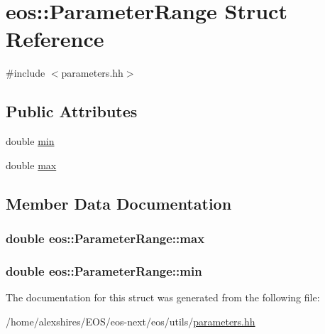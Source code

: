 \hypertarget{structeos_1_1ParameterRange}{
\section{eos::ParameterRange Struct Reference}
\label{structeos_1_1ParameterRange}
}


{\ttfamily \#include $<$parameters.hh$>$}\subsection*{Public Attributes}
\begin{DoxyCompactItemize}
\item 
double \hyperlink{structeos_1_1ParameterRange_ab155cf01cbc6b1ea802a007fe5bcc6c6}{min}
\item 
double \hyperlink{structeos_1_1ParameterRange_a8ce3020d0f5ca651abed940889bb434b}{max}
\end{DoxyCompactItemize}


\subsection{Member Data Documentation}
\hypertarget{structeos_1_1ParameterRange_a8ce3020d0f5ca651abed940889bb434b}{
\subsubsection[{max}]{\setlength{\rightskip}{0pt plus 5cm}double {\bf eos::ParameterRange::max}}}
\label{structeos_1_1ParameterRange_a8ce3020d0f5ca651abed940889bb434b}
\hypertarget{structeos_1_1ParameterRange_ab155cf01cbc6b1ea802a007fe5bcc6c6}{
\subsubsection[{min}]{\setlength{\rightskip}{0pt plus 5cm}double {\bf eos::ParameterRange::min}}}
\label{structeos_1_1ParameterRange_ab155cf01cbc6b1ea802a007fe5bcc6c6}


The documentation for this struct was generated from the following file:\begin{DoxyCompactItemize}
\item 
/home/alexshires/EOS/eos-\/next/eos/utils/\hyperlink{parameters_8hh}{parameters.hh}\end{DoxyCompactItemize}

